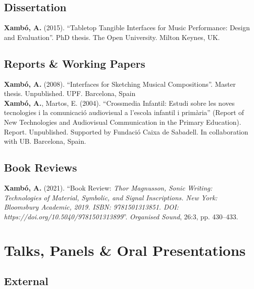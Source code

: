 \documentclass[10pt, a4paper]{article}
\newcommand{\years}[1]{\marginnote{\scriptsize #1}}
\begin{document}
{\subsection*{Dissertation}
\noindent

\years{2015}\textbf{Xambó, A.} (2015). ``Tabletop Tangible Interfaces for Music Performance: Design and Evaluation''. PhD thesis. The Open University. Milton Keynes, UK.

\subsection*{Reports \& Working Papers}
\noindent

\years{2008}\textbf{Xambó, A.} (2008). ``Interfaces for Sketching Musical Compositions''. Master thesis. Unpublished. UPF. Barcelona, Spain\\ 
\years{2004}\textbf{Xambó, A.}, Martos, E. (2004). ``Crossmedia Infantil: Estudi sobre les noves tecnologies i la comunicació audiovisual a l'escola infantil i primària'' (Report of New Technologies and Audiovisual Communication in the Primary Education). Report. Unpublished. Supported by Fundació Caixa de Sabadell. In collaboration with UB. Barcelona, Spain.

\subsection*{Book Reviews}
\noindent

\years{2021}\textbf{Xambó, A.} (2021). ``Book Review: \emph{Thor Magnusson, Sonic Writing: Technologies of Material, Symbolic, and Signal Inscriptions. New York: Bloomsbury Academic, 2019. ISBN: 9781501313851. DOI: https://doi.org/10.5040/9781501313899}''. \emph{Organised Sound}, 26:3, pp. 430–433.


\section*{Talks, Panels \& Oral Presentations}

\subsection*{External}
\noindent

}
\end{document}
